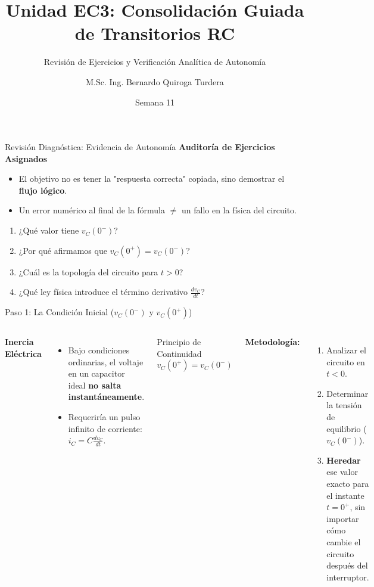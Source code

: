 \documentclass[aspectratio=169, 10pt]{beamer}
\title[Consolidación Guiada RC]{Unidad EC3: Consolidación Guiada de Transitorios RC}
\subtitle{Revisión de Ejercicios y Verificación Analítica de Autonomía}
\author[B. Quiroga Turdera]{M.Sc. Ing. Bernardo Quiroga Turdera}
\institute[UCB Tarija]{Universidad Católica Boliviana ``San Pablo'' --- Sede Tarija}
\date{Semana 11}
\begin{document}
\begin{frame}
    \titlepage
\end{frame}

\begin{frame}{Revisión Diagnóstica: Evidencia de Autonomía}
    \textbf{Auditoría de Ejercicios Asignados}
    \begin{itemize}
        \item El objetivo no es tener la "respuesta correcta" copiada, sino demostrar el \textbf{flujo lógico}.
        \item Un error numérico al final de la fórmula $\neq$ un fallo en la física del circuito.
    \end{itemize}
    \vspace{0.4cm}
    \begin{tcolorbox}[colback=white, colframe=ucbblue, title=Preguntas Centrales de Revisión]
        \begin{enumerate}
            \item ¿Qué valor tiene $v_C(0^-)$?
            \item ¿Por qué afirmamos que $v_C(0^+) = v_C(0^-)$?
            \item ¿Cuál es la topología del circuito para $t>0$?
            \item ¿Qué ley física introduce el término derivativo $\frac{dv_C}{dt}$?
        \end{enumerate}
    \end{tcolorbox}
\end{frame}

\begin{frame}{Paso 1: La Condición Inicial ($v_C(0^-)$ y $v_C(0^+)$)}
    \begin{columns}[T]
        \textbf{Inercia Eléctrica}
        \begin{itemize}
            \item Bajo condiciones ordinarias, el voltaje en un capacitor ideal \textbf{no salta instantáneamente}.
            \item Requeriría un pulso infinito de corriente: $i_C = C \frac{dv_C}{dt}$.
        \end{itemize}
        \begin{alertblock}{Principio de Continuidad}
            $$v_C(0^+) = v_C(0^-)$$
        \end{alertblock}

        \textbf{Metodología:}
        \begin{enumerate}
            \item Analizar el circuito en $t < 0$.
            \item Determinar la tensión de equilibrio ($v_C(0^-)$).
            \item \textbf{Heredar} ese valor exacto para el instante $t = 0^+$, sin importar cómo cambie el circuito después del interruptor.
        \end{enumerate}
    \end{columns}
\end{frame}
\end{document}
